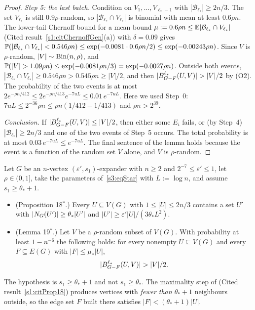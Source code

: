 \begin{proof}
\smallskip\noindent\emph{Step 5: the last batch.} Condition on
$V_1,\dots,V_{\ell_*-1}$ with $|\mathcal B_{\ell_*}|\ge2n/3$. The set
$V_{\ell_*}$ is still $0.9\rho$-random, so
$|\mathcal B_{\ell_*}\cap V_{\ell_*}|$ is binomial with mean at least
$0.6\rho n$. The lower-tail Chernoff bound for a mean bound $\mu:=0.6\rho n\le\mathbb{E}|\mathcal B_{\ell_*}\cap V_{\ell_*}|$
(Cited result~\ref{s1:citChernoffGen}(a)) with $\delta=0.09$ gives
$\mathbb{P}(|\mathcal B_{\ell_*}\cap V_{\ell_*}|<0.546\rho n)\le
\exp(-0.0081\cdot0.6\rho n/2)\le\exp(-0.00243\rho n)$. Since $V$ is
$\rho$-random, $|V|\sim\mathrm{Bin}(n,\rho)$, and
$\Prob(|V|>1.09\rho n)\le\exp(-0.0081\rho n/3)=\exp(-0.0027\rho n)$.
Outside both events,
$|\mathcal B_{\ell_*}\cap V_{\ell_*}|\ge0.546\rho n>0.545\rho n\ge|V|/2$,
and then $|\Ball{\ell_*}{G-F}{U,V}|>|V|/2$ by (O2). The probability of
the two events is at most
$2e^{-\rho n/412}\le 2e^{-\rho n/413}e^{-7uL}\le0.01\,e^{-7uL}$. Here we
used Step~0: $7uL\le2^{-36}\rho n\le\rho n(1/412-1/413)$ and
$\rho n>2^{39}$.

\smallskip\noindent\emph{Conclusion.} If
$|B^{\ell_*}_{G-F}(U,V)|\le|V|/2$, then either some $E_i$ fails, or
(by Step~4) $|\mathcal B_{\ell_*}|\ge2n/3$ and one of the two events of
Step~5 occurs. The total probability is at most
$0.03\,e^{-7uL}\le e^{-7uL}$. The final sentence of the lemma holds
because the event is a function of the random set $V$ alone, and $V$ is
$\rho$-random.
\end{proof}

\begin{lemma}\label{s3:lemP18s}
Let $G$ be an $n$-vertex $(\varepsilon',s_1)$-expander with $n\ge2$ and
$2^{-7}\le\varepsilon'\le1$, let $\rho\in(0,1]$, take the parameters
of~\eqref{s3:eqStar} with $L:=\log n$, and assume
$s_1\ge\theta_*+1$.
\begin{itemize}
\item[(i)] (Proposition 18$^*$.) Every $U\subseteq V(G)$ with
  $1\le|U|\le2n/3$ contains a set $U'$ with
  $|N_G(U')|\ge\theta_*|U'|$ and
  $|U'|\ge\varepsilon'|U|/(3\theta_*L^2)$.
\item[(ii)] (Lemma 19$^*$.) Let $V$ be a $\rho$-random subset of
  $V(G)$. With probability at least $1-n^{-6}$ the following holds: for
  every nonempty $U\subseteq V(G)$ and every $F\subseteq E(G)$ with
  $|F|\le\mu_*|U|$,
  \[
  |\Ball{\ell_*}{G-F}{U,V}|>|V|/2 .
  \]
\end{itemize}
The hypothesis is $s_1\ge\theta_*+1$ and not $s_1\ge\theta_*$. The
maximality step of \cite[Proposition~18]{BM} (Cited result~\ref{s1:citProp18})
produces vertices with \emph{fewer than $\theta_*+1$} neighbours outside,
so the edge set $F$ built there satisfies $|F|<(\theta_*+1)|U|$.
\deps{\ref{s1:citProp18}, \ref{s1:citLem19}, \ref{s3:lemL17s}, \ref{s1:citDef11}}
\end{lemma}

